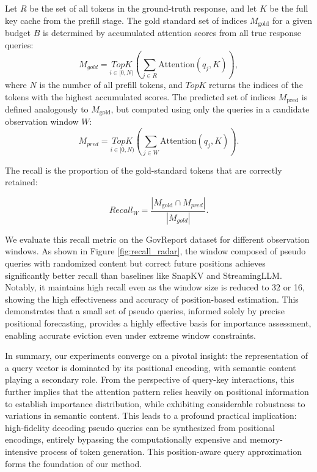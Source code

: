 Let $R$ be the set of all tokens in the ground-truth response, and let $K$ be the full key cache from the prefill stage. The gold standard set of indices $M_{\text{gold}}$ for a given budget $B$ is determined by accumulated attention scores from all true response queries:
\begin{equation}
M_{gold} = \underset{{i \in [0, N)}}{TopK}\left( \sum_{j \in R} \text{Attention}(q_j, K) \right),
\end{equation}
where $N$ is the number of all prefill tokens, and $TopK$ returns the indices of the tokens with the highest accumulated scores. The predicted set of indices $M_{\text{pred}}$ is defined analogously to $M_{\text{gold}}$, but computed using only the queries in a candidate observation window $W$:
\begin{equation}
M_{pred} = \underset{{i \in [0, N)}}{TopK}\left( \sum_{j \in W} \text{Attention}(q_j, K) \right).
\end{equation}

The recall is the proportion of the gold-standard tokens that are correctly retained:


\begin{equation}
Recall_{W} = \frac{| M_{\text{gold}} \cap M_{pred} |}{| M_{gold} |}.
\end{equation}


We evaluate this recall metric on the GovReport dataset for different observation windows. As shown in Figure \ref{fig:recall_radar}, the window composed of pseudo queries with randomized content but correct future positions achieves significantly better recall than baselines like SnapKV and StreamingLLM. Notably, it maintains high recall even as the window size is reduced to 32 or 16, showing the high effectiveness and accuracy of position-based estimation. This demonstrates that a small set of pseudo queries, informed solely by precise positional forecasting, provides a highly effective basis for importance assessment, enabling accurate eviction even under extreme window constraints.


In summary, our experiments converge on a pivotal insight: the representation of a query vector is dominated by its positional encoding, with semantic content playing a secondary role. From the perspective of query-key interactions, this further implies that the attention pattern relies heavily on positional information to establish importance distribution, while exhibiting considerable robustness to variations in semantic content. This leads to a profound practical implication: high-fidelity decoding pseudo queries can be synthesized from positional encodings, entirely bypassing the computationally expensive and memory-intensive process of token generation. This position-aware query approximation forms the foundation of our method.





